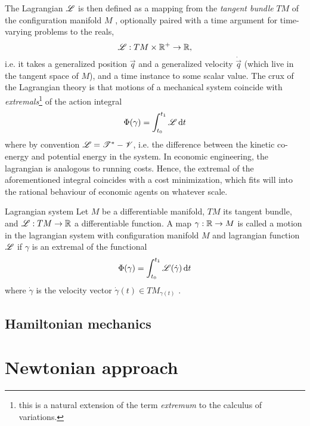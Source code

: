 The Lagrangian \(\mathscr{L}\) is then defined as a mapping from the \emph{tangent bundle} \(TM\) of the configuration manifold \(M\) , optionally paired with a time argument for time-varying problems to the reals,
    \[ \mathscr{L} : TM \times \mathbb{R}^+ \to \mathbb{R}, \]
i.e. it takes a generalized position \(\vec{q}\) and a generalized velocity \(\dot{\vec{q}}\) (which live in the tangent space of \(M\)), and a time instance to some scalar value. The crux of the Lagrangian theory is that motions of a mechanical system coincide with \emph{extremals}\footnote{this is a natural extension of the term \emph{extremum} to the calculus of variations.} of the action integral
\[ \Phi(\gamma) = \int^{t_1}_{t_0} \mathscr{L} \dd{t}\]
where by convention \(\mathscr{L} = \mathscr{T}^{*} - \mathscr{V}\), i.e. the difference between the kinetic co-energy and potential energy in the system. In economic engineering, the lagrangian is analogous to running costs. Hence, the extremal of the aforementioned integral coincides with a cost minimization, which fits will into the rational behaviour of economic agents on whatever scale.

\begin{block}{Lagrangian system}
    Let \(M\) be a differentiable manifold, \(TM\) its tangent bundle, and \(\mathscr{L}: TM \to \mathbb{R}\) a differentiable function. A map \(\gamma: \mathbb{R} \to M\)  is called a motion in the lagrangian system with configuration manifold \(M\) and lagrangian function \(\mathscr{L}\) if \(\gamma\) is an extremal of the functional
    \[
     \Phi(\gamma) =  \int^{t_1}_{t_0} \mathscr{L}\qty(\dot{\gamma})\dd{t}
\]
    where \(\dot{\gamma}\) is the velocity vector \(\dot{\gamma}(t) \in TM_{\gamma(t)}\) \cite{Arnold1989}.
\end{block}

\subsection{Hamiltonian mechanics}

\section{Newtonian approach}
